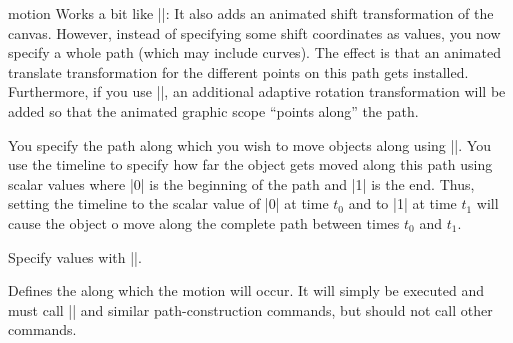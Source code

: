 \begin{sysanimateattribute}{motion}
    Works a bit like |\pgfsysanimvaltranslate|: It also adds an animated shift
    transformation of the canvas. However, instead of specifying some shift
    coordinates as values, you now specify a whole path (which may include
    curves). The effect is that an animated translate transformation for the
    different points on this path gets installed. Furthermore, if you use
    |\pgfsysanimkeyrotatealong|, an additional adaptive rotation transformation
    will be added so that the animated graphic scope ``points along'' the path.

    You specify the path along which you wish to move objects along using
    |\pgfsysanimkeymovealong|. You use the timeline to specify how far the
    object gets moved along this path using scalar values where |0| is the
    beginning of the path and |1| is the end. Thus, setting the timeline to the
    scalar value of |0| at time $t_0$ and to |1| at time $t_1$ will cause the
    object o move along the complete path between times $t_0$ and $t_1$.

    Specify values with |\pgfsysanimvalscalar|.

    \begin{command}{\pgfsysanimkeymovealong{}}
    \end{command}
    \begin{command}{\pgfsys@animation@movealong{}}
        Defines the  along which the motion will occur. It will
        simply be executed and must call |\pgfsys@lineto| and similar
        path-construction commands, but should not call other commands.
\begin{codeexample}[
    preamble={\usetikzlibrary{animations}},
    animation list={0.5,1,1.5,2},
    render instead={
\animationexample{node}{}{
  \pgfsysanimkeymovealong{
    \pgfsyssoftpath@movetotoken{0pt}{0pt}
    \pgfsyssoftpath@linetotoken{0pt}{-5mm}
    \pgfsyssoftpath@curvetosupportatoken{0pt}{-1cm}%
    \pgfsyssoftpath@curvetosupportbtoken{0pt}{-1cm}%
    \pgfsyssoftpath@curvetotoken{-5mm}{-1cm} }
  \pgfsysanimkeytime{0}{1}{1}{0}{0}
  \pgfsysanimvalscalar{0}
  \pgfsysanimkeytime{2}{1}{1}{0}{0}
  \pgfsysanimvalscalar{1}
  \pgfsysanimate{motion}
}
  }]
\end{codeexample}
    \end{command}


\end{sysanimateattribute}
